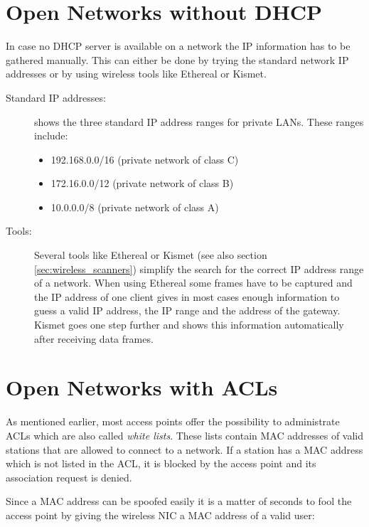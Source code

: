 \section{Open Networks without DHCP}

In case no DHCP server is available on a network the IP information has to be gathered manually. This can either be done by trying the standard network IP addresses or by using wireless tools like Ethereal or Kismet.

\begin{description}

	\item [Standard IP addresses:]
		\cite{ipv4} shows the three standard IP address ranges for private 
		LANs. These ranges include:

	\begin{itemize}
		\item 192.168.0.0/16 (private network of class C)
		\item 172.16.0.0/12 (private network of class B)
		\item 10.0.0.0/8 (private network of class A)
	\end{itemize}

	\item [Tools:]
		Several tools like Ethereal or Kismet (see also section \ref{sec:wireless_scanners}) simplify the search for the correct IP address range of a network. When using Ethereal some frames have to be captured and the IP address of one client gives in most cases enough information to guess a valid IP address, the IP range and the address of the gateway. Kismet goes one step further and shows this information automatically after receiving data frames.

\end{description}

\section{Open Networks with ACLs}

As mentioned earlier, most access points offer the possibility to administrate ACLs which are also called {\em white lists}. These lists contain MAC addresses of valid stations that are allowed to connect to a network. If a station has a MAC address which is not listed in the ACL, it is blocked by the access point and its association request is denied.

Since a MAC address can be spoofed easily it is a matter of seconds to fool the access point by giving the wireless NIC a MAC address of a valid user:

